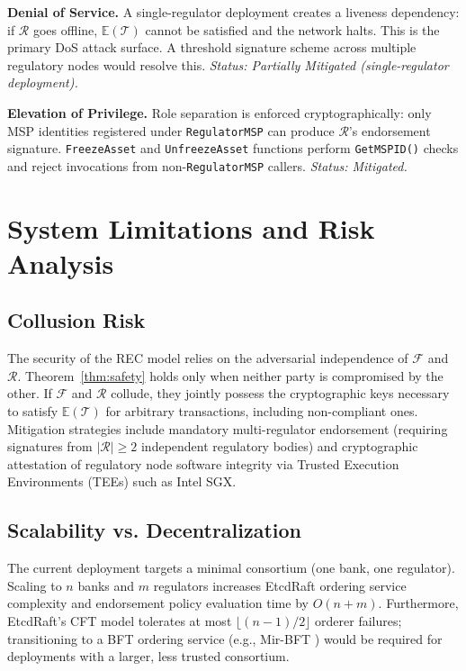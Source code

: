 \documentclass[journal,10pt,twocolumn]{IEEEtran}
\begin{document}
\textbf{Denial of Service.} A single-regulator deployment creates a liveness dependency: if $\mathcal{R}$ goes offline, $\mathbb{E}(\mathcal{T})$ cannot be satisfied and the network halts. This is the primary DoS attack surface. A threshold signature scheme \cite{ref:threshold_sig} across multiple regulatory nodes would resolve this. \textit{Status: Partially Mitigated (single-regulator deployment).}

\textbf{Elevation of Privilege.} Role separation is enforced cryptographically: only MSP identities registered under \texttt{RegulatorMSP} can produce $\mathcal{R}$'s endorsement signature. \texttt{FreezeAsset} and \texttt{UnfreezeAsset} functions perform \texttt{GetMSPID()} checks and reject invocations from non-\texttt{RegulatorMSP} callers. \textit{Status: Mitigated.}

\section{System Limitations and Risk Analysis}
\label{sec:limits}

\subsection{Collusion Risk}

The security of the REC model relies on the adversarial independence of $\mathcal{F}$ and $\mathcal{R}$. Theorem~\ref{thm:safety} holds only when neither party is compromised by the other. If $\mathcal{F}$ and $\mathcal{R}$ collude, they jointly possess the cryptographic keys necessary to satisfy $\mathbb{E}(\mathcal{T})$ for arbitrary transactions, including non-compliant ones. Mitigation strategies include mandatory multi-regulator endorsement (requiring signatures from $|\mathcal{R}| \geq 2$ independent regulatory bodies) and cryptographic attestation of regulatory node software integrity via Trusted Execution Environments (TEEs) such as Intel SGX.

\subsection{Scalability vs. Decentralization}

The current deployment targets a minimal consortium (one bank, one regulator). Scaling to $n$ banks and $m$ regulators increases EtcdRaft ordering service complexity and endorsement policy evaluation time by $O(n + m)$. Furthermore, EtcdRaft's CFT model tolerates at most $\lfloor(n-1)/2\rfloor$ orderer failures; transitioning to a BFT ordering service (e.g., Mir-BFT \cite{ref:mirbft}) would be required for deployments with a larger, less trusted consortium.
\end{document}
